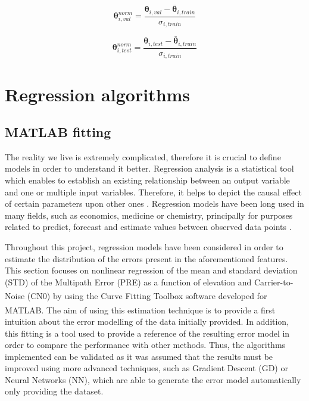 \documentclass[a4paper, report, oneside, UKenglish]{memoir}
\newcommand{\btheta}{\boldsymbol{\theta}}
\begin{document}
\begin{equation}
    \btheta_{i, val}^{norm} = \frac{\btheta_{i, val} - \bar{\btheta}_{i, train}}{\sigma_{i, train}}
\end{equation}

\begin{equation}
    \btheta_{i, test}^{norm} = \frac{\btheta_{i, test} - \bar{\btheta}_{i, train}}{\sigma_{i, train}}
\end{equation}



\chapter{Regression algorithms}\label{ch:fitting}

\section{MATLAB fitting}\label{matlabfit}

The reality we live is extremely complicated, therefore it is crucial to define models in order to understand it better. Regression analysis is a statistical tool which enables to establish an existing relationship between an output variable and one or multiple input variables. Therefore, it helps to depict the causal effect of certain parameters upon other ones \cite{IntroToRegresAna}. Regression models have been long used in many fields, such as economics, medicine or chemistry, principally for purposes related to predict, forecast and estimate values between observed data points \cite{MathWorksRegression}.  

Throughout this project, regression models have been considered in order to estimate the distribution of the errors present in the aforementioned features. This section focuses on nonlinear regression of the mean and standard deviation (STD) of the Multipath Error (PRE) as a function of elevation and Carrier-to-Noise (CN0) by using the Curve Fitting Toolbox\textsuperscript{\tiny\texttrademark} software developed for MATLAB\textsuperscript{\tiny\textregistered}. The aim of using this estimation technique is to provide a first intuition about the error modelling of the data initially provided. In addition, this fitting is a tool used to provide a reference of the resulting error model in order to compare the performance with other methods. Thus, the algorithms implemented can be validated as it was assumed that the results must be improved using more advanced techniques, such as Gradient Descent (GD) or Neural Networks (NN), which are able to generate the error model automatically only providing the dataset. 
\end{document}
